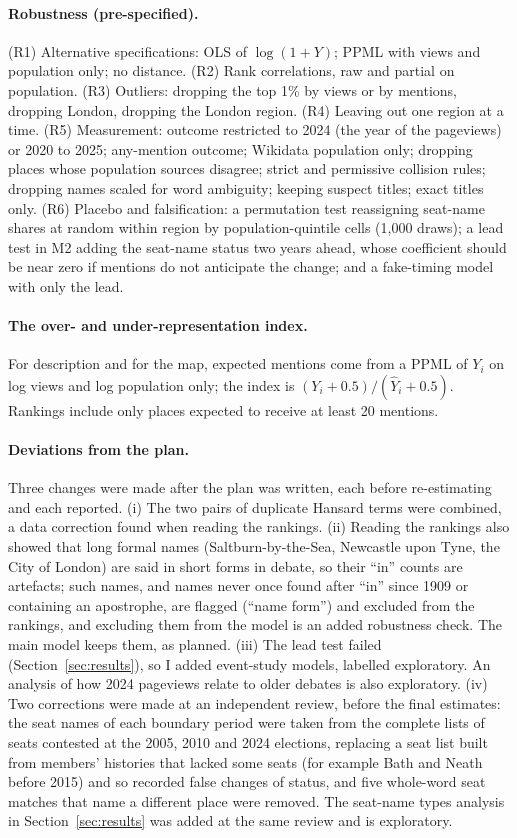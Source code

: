 \documentclass[11pt,a4paper]{article}
\begin{document}
\paragraph{Robustness (pre-specified).} (R1) Alternative specifications: OLS of $\log(1+Y)$; PPML with views and population only; no distance. (R2) Rank correlations, raw and partial on population. (R3) Outliers: dropping the top 1\% by views or by mentions, dropping London, dropping the London region. (R4) Leaving out one region at a time. (R5) Measurement: outcome restricted to 2024 (the year of the pageviews) or 2020 to 2025; any-mention outcome; Wikidata population only; dropping places whose population sources disagree; strict and permissive collision rules; dropping names scaled for word ambiguity; keeping suspect titles; exact titles only. (R6) Placebo and falsification: a permutation test reassigning seat-name shares at random within region by population-quintile cells (1,000 draws); a lead test in M2 adding the seat-name status two years ahead, whose coefficient should be near zero if mentions do not anticipate the change; and a fake-timing model with only the lead.

\paragraph{The over- and under-representation index.} For description and for the map, expected mentions come from a PPML of $Y_i$ on log views and log population only; the index is $(Y_i + 0.5)/(\hat Y_i + 0.5)$. Rankings include only places expected to receive at least 20 mentions.

\paragraph{Deviations from the plan.} Three changes were made after the plan was written, each before re-estimating and each reported. (i) The two pairs of duplicate Hansard terms were combined, a data correction found when reading the rankings. (ii) Reading the rankings also showed that long formal names (Saltburn-by-the-Sea, Newcastle upon Tyne, the City of London) are said in short forms in debate, so their ``in'' counts are artefacts; such names, and names never once found after ``in'' since 1909 or containing an apostrophe, are flagged (``name form'') and excluded from the rankings, and excluding them from the model is an added robustness check. The main model keeps them, as planned. (iii) The lead test failed (Section~\ref{sec:results}), so I added event-study models, labelled exploratory. An analysis of how 2024 pageviews relate to older debates is also exploratory. (iv) Two corrections were made at an independent review, before the final estimates: the seat names of each boundary period were taken from the complete lists of seats contested at the 2005, 2010 and 2024 elections, replacing a seat list built from members' histories that lacked some seats (for example Bath and Neath before 2015) and so recorded false changes of status, and five whole-word seat matches that name a different place were removed. The seat-name types analysis in Section~\ref{sec:results} was added at the same review and is exploratory.
\end{document}
